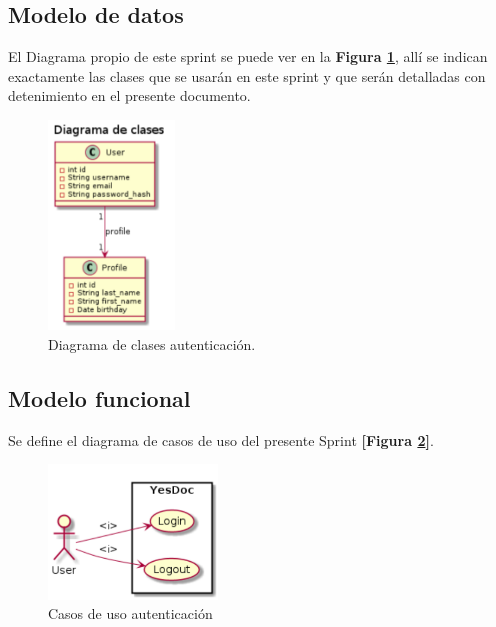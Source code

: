 \subsection{Modelo de datos}
El Diagrama propio de este sprint se puede ver en la \textbf{Figura \ref{5-clase_autenticacion}}, allí se indican exactamente las clases que se usarán en este sprint y que serán detalladas con detenimiento en el presente documento. 

\begin{figure}[h]
        \centering
        \includegraphics[width=0.3\textwidth]{img/clases_auth}
        \caption{Diagrama de clases autenticación.}
		\label{5-clase_autenticacion}
    \end{figure}

\subsection{Modelo funcional} 
Se define el diagrama de casos de uso del presente Sprint \textbf{[Figura \ref{4-cu_autenticacion}]}.

    \begin{figure}[h]
        \centering
        \includegraphics[width=0.4\textwidth]{img/cu_autenticacion}
        \caption{Casos de uso autenticación}
		\label{4-cu_autenticacion}
    \end{figure}

